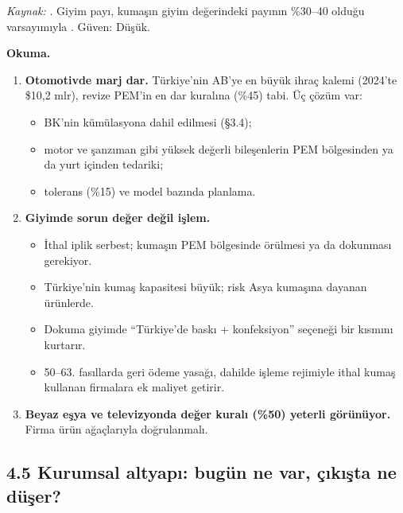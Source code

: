 \endgroup

\emph{Kaynak:} \etiketT{} . Giyim payı, kumaşın giyim değerindeki payının \%30--40 olduğu varsayımıyla \etiketH{}. Güven: Düşük.

\textbf{Okuma.}

\begin{enumerate}
\def\labelenumi{\arabic{enumi}.}
\tightlist
\item
  \textbf{Otomotivde marj dar.} Türkiye'nin AB'ye en büyük ihraç kalemi (2024'te \$10,2 mlr), revize PEM'in en dar kuralına (\%45) tabi. Üç çözüm var:

  \begin{itemize}
  \tightlist
  \item
    BK'nin kümülasyona dahil edilmesi (§3.4);
  \item
    motor ve şanzıman gibi yüksek değerli bileşenlerin PEM bölgesinden ya da yurt içinden tedariki;
  \item
    tolerans (\%15) ve model bazında planlama.
  \end{itemize}
\item
  \textbf{Giyimde sorun değer değil işlem.}

  \begin{itemize}
  \tightlist
  \item
    İthal iplik serbest; kumaşın PEM bölgesinde örülmesi ya da dokunması gerekiyor.
  \item
    Türkiye'nin kumaş kapasitesi büyük; risk Asya kumaşına dayanan ürünlerde.
  \item
    Dokuma giyimde ``Türkiye'de baskı + konfeksiyon'' seçeneği bir kısmını kurtarır.
  \item
    50--63. fasıllarda geri ödeme yasağı, dahilde işleme rejimiyle ithal kumaş kullanan firmalara ek maliyet getirir.
  \end{itemize}
\item
  \textbf{Beyaz eşya ve televizyonda değer kuralı (\%50) yeterli görünüyor.} Firma ürün ağaçlarıyla doğrulanmalı.
\end{enumerate}

\hypertarget{02c_hazirlik-45-kurumsal-altyapux131-buguxfcn-ne-var-uxe7ux131kux131ux15fta-ne-duxfcux15fer}{%
\subsection{4.5 Kurumsal altyapı: bugün ne var, çıkışta ne düşer?}\label{02c_hazirlik-45-kurumsal-altyapux131-buguxfcn-ne-var-uxe7ux131kux131ux15fta-ne-duxfcux15fer}}

